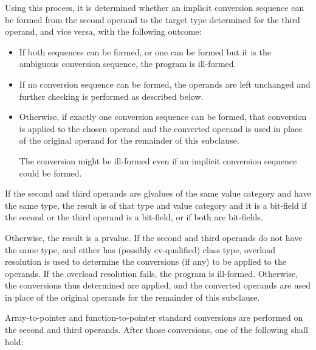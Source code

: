 Using this process, it is determined whether an implicit conversion
sequence can be formed from the second operand
to the target type determined for the third operand, and vice versa,
with the following outcome:
\begin{itemize}
\item If both sequences can be formed, or one can be formed but it is the
ambiguous conversion sequence, the program is ill-formed.
\item If no conversion sequence can be formed, the operands are left unchanged
and further checking is performed as described below.
\item Otherwise, if exactly one conversion sequence can be formed,
that conversion is applied to the chosen operand
and the converted operand is used in place of the original operand for
the remainder of this subclause.
\begin{note}
The conversion might be ill-formed even if an implicit conversion
sequence could be formed.
\end{note}
\end{itemize}

\pnum
If the second and third operands are glvalues of the same value category
and have the same type, the
result is of that type and value category and it is a bit-field if the
second or the third operand is a bit-field, or if both are bit-fields.

\pnum
Otherwise, the result is a prvalue. If the second and third operands do
not have the same type, and either has (possibly cv-qualified) class
type, overload resolution is used to determine the conversions (if any)
to be applied to the operands.
If the overload resolution fails, the program is ill-formed. Otherwise,
the conversions thus determined are applied, and the converted operands
are used in place of the original operands for the remainder of this
subclause.

\pnum
Array-to-pointer
and function-to-pointer standard conversions are
performed on the second and third operands. After those conversions, one
of the following shall hold:

